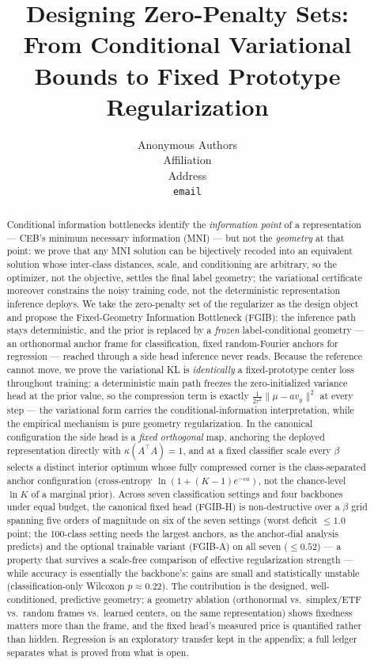 \documentclass{article} %
\title{Designing Zero-Penalty Sets: \\ From Conditional Variational Bounds to Fixed Prototype Regularization}
\author{Anonymous Authors \\
Affiliation \\
Address \\
\texttt{email}
}
\begin{document}
\maketitle

\begin{abstract}
Conditional information bottlenecks identify the \emph{information point} of a
representation --- CEB's minimum necessary information (MNI) --- but not the
\emph{geometry} at that point: we prove that any MNI solution can be bijectively
recoded into an equivalent solution whose inter-class distances, scale, and
conditioning are arbitrary, so the optimizer, not the objective, settles the final
label geometry; the variational certificate moreover constrains the noisy training
code, not the deterministic representation inference deploys. We take the
zero-penalty set of the regularizer as the design object and propose the
Fixed-Geometry Information Bottleneck (FGIB): the inference path stays deterministic,
and the prior is replaced by a \emph{frozen} label-conditional geometry --- an
orthonormal anchor frame for classification, fixed random-Fourier anchors for
regression --- reached through a side head inference never reads. Because the
reference cannot move, we prove the variational KL is \emph{identically} a
fixed-prototype center loss throughout training: a deterministic main path freezes
the zero-initialized variance head at the prior value, so the compression term is
exactly $\tfrac{1}{2\tau^2}\|\mu-a v_y\|^2$ at every step --- the variational form
carries the conditional-information interpretation, while the empirical mechanism is
pure geometry regularization. In the canonical configuration the side head is a
\emph{fixed orthogonal} map, anchoring the deployed representation directly with
$\kappa(A^{\top}A)=1$, and at a fixed classifier scale every $\beta$ selects a
distinct interior optimum whose fully compressed corner is the class-separated anchor
configuration (cross-entropy $\ln(1+(K{-}1)e^{-ca})$, not the chance-level $\ln K$ of
a marginal prior). Across seven classification settings and four backbones under
equal budget, the canonical fixed head (FGIB-H) is non-destructive over a $\beta$
grid spanning five orders of magnitude on six of the seven settings (worst deficit
$\le 1.0$ point; the 100-class setting needs the largest anchors, as the
anchor-dial analysis predicts) and the optional trainable variant (FGIB-A) on all
seven ($\le 0.52$) --- a property that survives a scale-free comparison of effective
regularization strength --- while accuracy is essentially the backbone's: gains are
small and statistically unstable (classification-only
Wilcoxon $p\approx0.22$). The contribution is the designed, well-conditioned,
predictive geometry; a geometry ablation (orthonormal vs.\ simplex/ETF vs.\ random
frames vs.\ learned centers, on the same representation) shows fixedness matters more
than the frame, and the fixed head's measured price is quantified rather than hidden.
Regression is an exploratory transfer kept in the appendix; a full ledger separates
what is proved from what is open.
\end{abstract}
\end{document}
